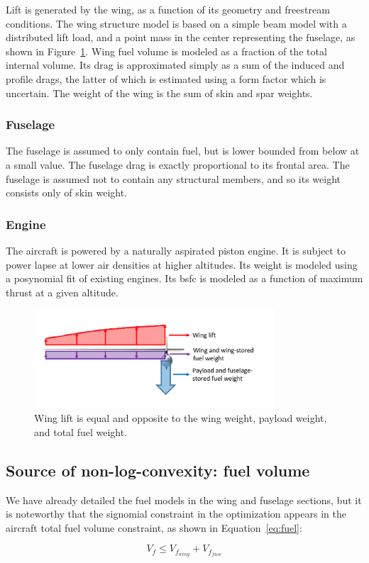 Lift is generated by the wing, as a function of its geometry and freestream conditions.
The wing structure model is based on a simple beam model with a distributed lift load,
and a point mass in the center representing the fuselage, as shown in Figure~\ref{fig:liftweight}.
Wing fuel volume is modeled as a fraction of the total internal volume. Its drag is
approximated simply as a sum of the induced and profile drags, the latter of which is estimated using a
form factor which is uncertain. The weight of the wing is the sum of skin and spar weights.

\subsubsection{Fuselage}

The fuselage is assumed to only contain fuel, but is lower bounded from below at a small value.
The fuselage drag is exactly proportional to its frontal area.
The fuselage is assumed not to contain any structural members, and so its weight consists only of skin weight.

\subsubsection{Engine}

The aircraft is powered by a naturally aspirated piston engine. It is subject to
power lapse at lower air densities at higher altitudes. Its weight is modeled using a posynomial fit of existing
engines. Its \gls{bsfc} is modeled as a function of maximum thrust at a given altitude.


\begin{figure}
\centering
\caption{\label{fig:liftweight} Wing lift is equal and opposite to the wing weight, payload weight, and total fuel weight.}
\includegraphics[width=0.8\textwidth]{liftweight.PNG}
\end{figure}

\subsection{Source of non-log-convexity: fuel volume}
We have already detailed the fuel models in the wing and fuselage sections, but it is noteworthy that
the signomial constraint in the optimization appears in the aircraft total fuel volume constraint,
as shown in Equation~\ref{eq:fuel}:

\begin{equation}
\label{eq:fuel}
V_f \leq V_{f_{wing}} + V_{f_{fuse}} 
\end{equation}
